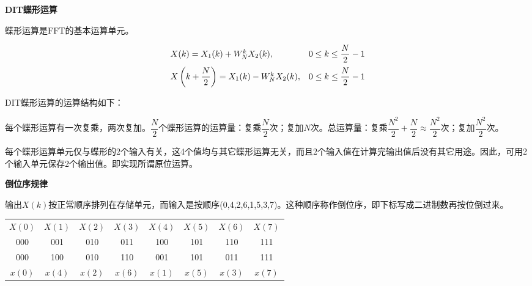 \documentclass[cn, hazy, blue, normal, 14pt]{elegantnote}
\begin{document}
\textbf{DIT蝶形运算}

蝶形运算是FFT的基本运算单元。

\begin{equation}
\begin{array}{ll}
    X(k)=X_1(k)+W_N^k X_2(k), & 0\leq k\leq \dfrac{N}{2}-1 \\
    \addlinespace
    X\left(k+\dfrac{N}{2}\right)=X_1(k)-W_N^k X_2(k), & 0\leq k\leq \dfrac{N}{2}-1
\end{array}
\end{equation}

DIT蝶形运算的运算结构如下：

\begin{center}
\end{center}

每个蝶形运算有一次复乘，两次复加。$\dfrac{N}{2}$个蝶形运算的运算量：复乘$\dfrac{N}{2}$次；复加$N$次。总运算量：复乘$\dfrac{N^2}{2}+\dfrac{N}{2}\approx \dfrac{N^2}{2}$次；复加$\dfrac{N^2}{2}$次。

每个蝶形运算单元仅与蝶形的2个输入有关，这4个值均与其它蝶形运算无关，而且2个输入值在计算完输出值后没有其它用途。因此，可用2个输入单元保存2个输出值。即实现所谓原位运算。

\textbf{倒位序规律}

输出$X(k)$按正常顺序排列在存储单元，而输入是按顺序(0,4,2,6,1,5,3,7)。这种顺序称作倒位序，即下标写成二进制数再按位倒过来。

\begin{table}[htbp]
\centering
\begin{tabular}{|c|c|c|c|c|c|c|c|}
    $X(0)$ & $X(1)$ & $X(2)$ & $X(3)$ & $X(4)$ & $X(5)$ & $X(6)$ & $X(7)$ \\
    000 & 001 & 010 & 011 & 100 & 101 & 110 & 111 \\
    000 & 100 & 010 & 110 & 001 & 101 & 011 & 111 \\
    $x(0)$ & $x(4)$ & $x(2)$ & $x(6)$ & $x(1)$ & $x(5)$ & $x(3)$ & $x(7)$
\end{tabular}
\end{table}
\end{document}
